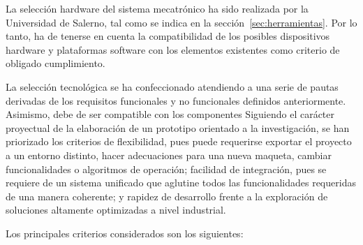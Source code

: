 La selección hardware del sistema mecatrónico ha sido realizada por la Universidad de Salerno, tal como se indica en la sección~\ref{sec:herramientas}. Por lo tanto, ha de tenerse en cuenta la compatibilidad de los posibles dispositivos hardware y plataformas software con los elementos existentes como criterio de obligado cumplimiento.

La selección tecnológica se ha confeccionado atendiendo a una serie de pautas derivadas de los requisitos funcionales y no funcionales definidos anteriormente. Asimismo, debe de ser compatible con los componentes Siguiendo el carácter proyectual de la elaboración de un prototipo orientado a la investigación, se han priorizado los criterios de flexibilidad, pues puede requerirse exportar el proyecto a un entorno distinto, hacer adecuaciones para una nueva maqueta, cambiar funcionalidades o algoritmos de operación; facilidad de integración, pues se requiere de un sistema unificado que aglutine todos las funcionalidades requeridas de una manera coherente; y rapidez de desarrollo frente a la exploración de soluciones altamente optimizadas a nivel industrial.

Los principales criterios considerados son los siguientes:

